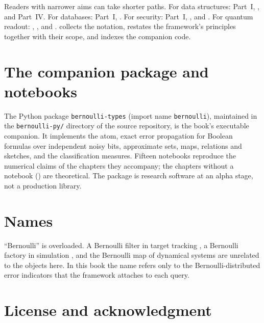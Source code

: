 Readers with narrower aims can take shorter paths. For data structures:
Part~I, ,
and Part~IV. For databases: Part~I, .
For security: Part~I, , and
. For
quantum readout: ,
, and .
 collects the notation,  restates the
framework's principles together with their scope, and 
indexes the companion code.

\section*{The companion package and notebooks}

The Python package \texttt{bernoulli-types} (import name \texttt{bernoulli}),
maintained in the \texttt{bernoulli-py/} directory of the source repository,
is the book's executable companion. It implements the atom, exact error
propagation for Boolean formulas over independent noisy bits, approximate sets,
maps, relations and sketches, and the classification measures. Fifteen
notebooks reproduce the numerical claims of the chapters they accompany; the
chapters without a notebook ()
are theoretical. The package is research software at an alpha stage, not a
production library.

\section*{Names}

``Bernoulli'' is overloaded. A Bernoulli filter in target tracking
\parencite{ristic-et-al-2013}, a Bernoulli factory in simulation
\parencite{keane-obrien-1994}, and the Bernoulli map of dynamical
systems are unrelated to the objects here. In this book the name refers only to the
Bernoulli-distributed error indicators that the framework attaches to each
query.

\section*{License and acknowledgment}

